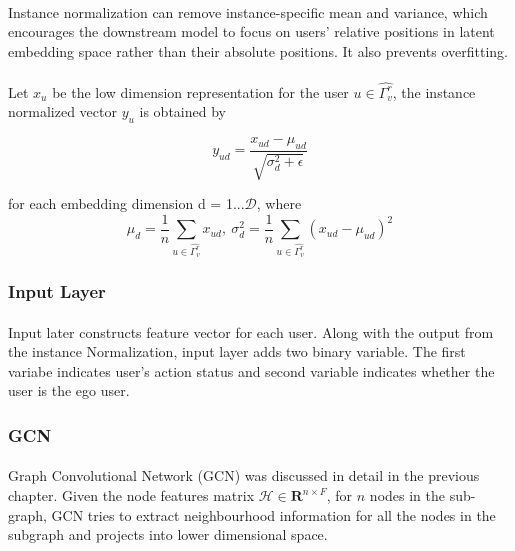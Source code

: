 \paragraph{} Instance normalization can remove instance-specific mean and variance, which encourages the downstream model 
to focus on users’ relative positions in latent embedding space rather than their absolute positions. It also prevents 
overfitting.

\paragraph{} Let $x_u$ be the low dimension representation for the user $u \in \hat{\Gamma_v^r}$, the instance normalized
vector $y_u$ is obtained by

\begin{equation}
    y_{ud} = \frac{x_{ud}-\mu_{ud}}{\sqrt{\sigma_d^2+\epsilon}}
\end{equation}

for each embedding dimension d = 1...$\mathcal{D}$, where 
\begin{equation}
    \mu_d = \frac{1}{n}\sum_{u \in \hat{\Gamma_v^r}}x_{ud},\ \sigma_d^2 = \frac{1}{n}\sum_{u \in \hat{\Gamma_v^r}}(x_{ud}-\mu_{ud})^2
\end{equation}


\subsubsection{Input Layer}

\paragraph{} Input later constructs feature vector for each user. Along with the output from the instance Normalization,
input layer adds two binary variable. The first variabe indicates user's action status and second variable indicates whether
the user is the ego user.

\subsubsection{GCN}

\paragraph{} Graph Convolutional Network (GCN) was discussed in detail in the previous chapter. Given the node features 
matrix $\mathcal{H} \in \mathbf{R}^{n \times F}$, for $n$ nodes in the sub-graph, GCN tries to extract neighbourhood 
information for all the nodes in the subgraph and projects into lower dimensional space.

